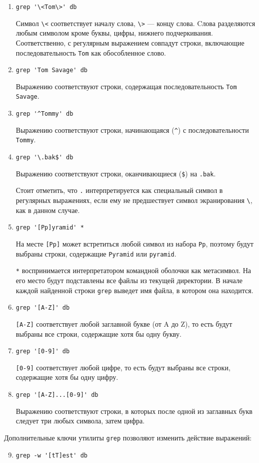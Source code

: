 \documentclass[listings]{labreport}
\begin{document}
\begin{enumerate}
\item \verb|grep '\<Tom\>' db|

Символ \verb|\<| соответствует началу слова, \verb|\>| — концу слова.
Cлова разделяются любым символом кроме буквы, цифры, нижнего подчеркивания.
Соответственно, с регулярным выражением совпадут строки, включающие последовательность \texttt{Tom}
как обособленное слово.

\item \verb|grep 'Tom Savage' db|

Выражению соответствуют строки, содержащая последовательность \texttt{Tom Savage}.

\item \verb|grep '^Tommy' db|

Выражению соответствуют строки, начинающаяся (\verb|^|) с последовательности \texttt{Tommy}.

\item \verb|grep '\.bak$' db|

Выражению соответствуют строки, оканчивающиеся (\verb|$|) на \texttt{.bak}.

Стоит отметить, что \verb|.| интерпретируется как специальный символ в регулярных выражениях,
если ему не предшествует символ экранирования \verb|\|, как в данном случае.

\item \verb|grep '[Pp]yramid' *|

На месте \verb|[Pp]| может встретиться любой символ из набора \texttt{Pp}, поэтому
будут выбраны строки, содержащие \texttt{Pyramid} или \texttt{pyramid}.

\texttt{*} воспринимается интерпретатором командной оболочки как метасимвол. На его
место будут подставлены все файлы из текущей директории. В начале каждой найденной строки
\texttt{grep} выведет имя файла, в котором она находится.

\item \verb|grep '[A-Z]' db|

\verb|[A-Z]| соответствует любой заглавной букве (от A до Z), то есть будут выбраны все
строки, содержащие хотя бы одну букву.

\item \verb|grep '[0-9]' db|

\verb|[0-9]| соответствует любой цифре, то есть будут выбраны все строки, содержащие хотя бы одну цифру.

\item \verb|grep '[A-Z]...[0-9]' db|

Выражению соответствуют строки, в которых после одной из заглавных букв следует три любых символа,
затем цифра.

\end{enumerate}

Дополнительные ключи утилиты \verb|grep| позволяют изменить действие выражений:

\begin{enumerate}
\setcounter{enumi}{8}

\item \verb|grep -w '[tT]est' db|
\end{enumerate}
\end{document}
